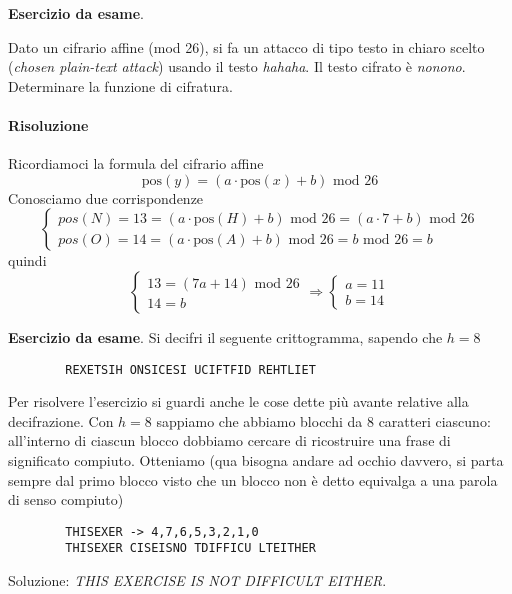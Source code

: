 \begin{framed} 
	\noindent \textbf{Esercizio da esame}. 
	
	\noindent Dato un cifrario affine (mod 26), si fa un attacco di tipo testo in chiaro scelto (\emph{chosen plain-text
		attack}) usando il testo \emph{hahaha}. Il testo cifrato è \emph{nonono}. Determinare la funzione di cifratura.
	
	\paragraph{Risoluzione} Ricordiamoci la formula del cifrario affine
	$$\text{pos}(y)=\left(a \cdot \text{pos}(x)+ b\right) \text{ mod } 26$$
	Conosciamo due corrispondenze
	\[\begin{cases}pos(N)=13=\left(a \cdot \text{pos}(H)+b\right)\text{ mod }26=\left(a \cdot 7+b\right)\text{ mod }26\\pos(O)=14=\left(a \cdot \text{pos}(A)+b\right)\text{ mod }26=b\text{ mod }26=b\end{cases}\]
	quindi
	\[\begin{cases}13=\left(7a+14\right)\text{ mod }26\\14=b\end{cases} \Longrightarrow \begin{cases}a=11\\b=14\end{cases}\]
\end{framed} 


\begin{framed}
	\noindent \textbf{Esercizio da esame}. Si decifri il seguente crittogramma, sapendo che $h=8$
	\begin{verbatim}
		REXETSIH ONSICESI UCIFTFID REHTLIET
	\end{verbatim}
	Per risolvere l'esercizio si guardi anche le cose dette più avante relative alla decifrazione. Con $h=8$ sappiamo che abbiamo blocchi da 8 caratteri ciascuno: all'interno di ciascun blocco dobbiamo cercare di ricostruire una frase di significato compiuto. Otteniamo (qua bisogna andare ad occhio davvero, si parta sempre dal primo blocco visto che un blocco non è detto equivalga a una parola di senso compiuto)
	\begin{verbatim}
		THISEXER -> 4,7,6,5,3,2,1,0
		THISEXER CISEISNO TDIFFICU LTEITHER
	\end{verbatim}
	Soluzione: \emph{THIS EXERCISE IS NOT DIFFICULT EITHER}.
\end{framed}

